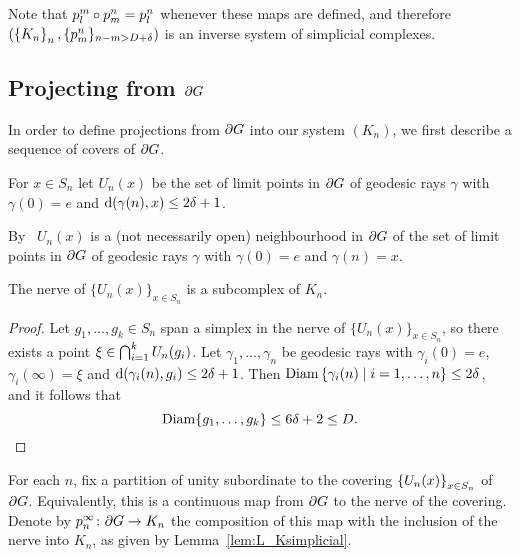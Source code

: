\documentclass[a4paper]{article}
\begin{document}
\begin{remark}
  Note that $p^m_l \circ p^n_m = p^n_l$ whenever these maps are defined, and 
  therefore $(\left\{K_n\right\}_n, \{p^n_m\}_{n - m > D + \delta})$ is an inverse system 
  of simplicial complexes.
\end{remark}

\subsection{Projecting from $\partial G$}

In order to define projections from $\partial G$ into our system $(K_n)$, we
first describe a sequence of covers of $\partial G$.

\begin{definition}
  For $x \in S_n$ let $U_n(x)$ be the set of limit points in $\partial G$ of 
  geodesic rays $\gamma$ with $\gamma(0) = e$ and $\operatorname{d}(\gamma(n), x) \leq 
  2\delta+1$.  
  
  By~\cite[III.H.3.6]{bridsonhaefliger99} $U_n(x)$ is a (not necessarily open)
  neighbourhood in $\partial G$ of the set of limit points in $\partial G$ of
  geodesic rays $\gamma$ with $\gamma(0) = e$ and $\gamma(n) = x$.
\end{definition}

\begin{lemma}\label{lem:L_Ksimplicial}
  The nerve of $\{U_n(x)\}_{x \in S_n}$ is a subcomplex of $K_n$.
\end{lemma}

\begin{proof}
  Let $g_1, \dotsc, g_k \in S_n$ span a simplex in the nerve of
  $\{U_n(x)\}_{x \in S_n}$, so there exists a point $\xi \in
  \bigcap_{i=1}^k U_n(g_i)$.  Let $\gamma_1, \dotsc, \gamma_n$ be
  geodesic rays with $\gamma_i(0) = e$, $\gamma_i(\infty) = \xi$ and
  $\operatorname{d}(\gamma_i(n), g_i) \leq 2\delta+1$.  Then $\operatorname{Diam}\left\{\gamma_i(n)
  \mid i=1, \dotsc, n\right\} \leq 2\delta$, and it follows that
  \begin{equation*}
    \operatorname{Diam}\{g_1, \dotsc, g_k\} \leq 6\delta+ 2 \leq D.\qedhere
  \end{equation*}
\end{proof}

\begin{definition}
  For each $n$, fix a partition of unity subordinate to the covering
  $\left\{U_n(x)\right\}_{x \in S_n}$ of $\partial G$. Equivalently, this is a
  continuous map from $\partial G$ to the nerve of the covering. Denote by
  $p^\infty_n\colon \partial G \to K_n$ the composition of this map with the
  inclusion of the nerve into $K_n$, as given by Lemma~\ref{lem:L_Ksimplicial}.
\end{definition}
\end{document}
